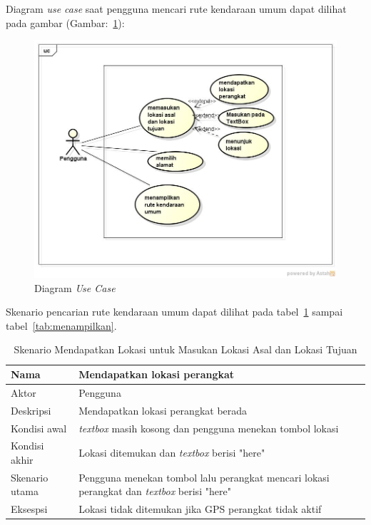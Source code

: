 \newpage
Diagram \textit{use case} saat pengguna mencari rute kendaraan umum dapat dilihat pada gambar (Gambar:~\ref{fig:UseCase}):
\begin{figure}[h]
	\centering
		\includegraphics[scale=0.5]{Gambar/useCase_dan_Class/UseCase}
	\caption{Diagram \textit{Use Case}}
	\label{fig:UseCase}
\end{figure}

Skenario pencarian rute kendaraan umum dapat dilihat pada tabel~\ref{tab:mandapatLokasi} sampai tabel~\ref{tab:menampilkan}.
\begin{table}[H]
	\centering
		\begin{tabular}{ |p{2cm}|p{10cm}| }
			\hline
			Nama &  Mendapatkan lokasi perangkat\\ \hline
			Aktor & Pengguna  \\ \hline
			Deskripsi & Mendapatkan lokasi perangkat berada  \\ \hline
			Kondisi awal & \textit{textbox} masih kosong dan pengguna menekan tombol lokasi \\ \hline
			Kondisi akhir & Lokasi ditemukan dan \textit{textbox} berisi "here" \\ \hline
			Skenario utama & Pengguna menekan tombol lalu perangkat mencari lokasi perangkat dan \textit{textbox} berisi "here" \\ \hline
			Eksespsi & Lokasi tidak ditemukan jika GPS perangkat tidak aktif  \\ 
			\hline
		\end{tabular}
	\caption{Skenario Mendapatkan Lokasi untuk Masukan Lokasi Asal dan Lokasi Tujuan}
	\label{tab:mandapatLokasi}
\end{table}

